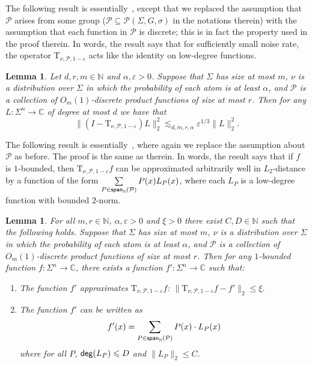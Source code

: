 \documentclass[11pt]{article}
\newtheorem{lemma}[thm]{Lemma}
\newcommand\norm[1]{\| #1 \|}
\renewcommand{\lll}{\lesssim}
\newcommand\spn{{\sf span}_{\mathbb{N}}}
\newcommand\eps{\varepsilon}
\renewcommand\leq{\leqslant}
\begin{document}
The following result is essentially~\cite[Claim 4.5]{BKM5}, except that we replaced the assumption that $\mathcal{P}$ arises from some group ($\mathcal{P}\subseteq\mathcal{P}(\Sigma,G,\sigma)$ in the notations therein) with the assumption that each function in $\mathcal{P}$ is discrete; this is in fact the property used in the proof therein. In words, the result says that for sufficiently small noise rate, the operator $\mathrm{T}_{\nu,\mathcal{P},1-\eps}$ acts like the identity on low-degree functions.
\begin{lemma}\label{lem:act_on_ld}
		Let $d,r,m\in\mathbb{N}$ and $\alpha,\eps>0$.
		Suppose that $\Sigma$ has size at most $m$, $\nu$ is a distribution over $\Sigma$
		in which the probability of each atom is at least $\alpha$, and
		$\mathcal{P}$
		is a collection of $O_m(1)$-discrete product functions of size at most $r$. Then for any $L\colon \Sigma^n\to\mathbb{C}$ of degree at most $d$
		we have that
		\[
		\norm{(I-\mathrm{T}_{\nu,\mathcal{P}, 1-\eps})L}_2^2\lll_{d,m,r,\alpha} \eps^{1/3}\norm{L}_2^2.
		\]
	\end{lemma}
The following result is essentially~\cite[Lemma 4.9]{BKM5}, where again we replace the assumption about $\mathcal{P}$ as before. The proof is the same as therein. In words, the result says that if $f$ is $1$-bounded, then $\mathrm{T}_{\nu,\mathcal{P}, 1-\eps}f$ can be approximated arbitrarily well in $L_2$-distance by a function of the form 
$\sum\limits_{P\in \spn(\mathcal{P})} P(x)L_P(x)$, where each $L_P$ is a low-degree function with bounded $2$-norm.
\begin{lemma}\label{lem:approx_formula}
		For all $m,r\in\mathbb{N}$, $\alpha, \eps>0$ and $\xi>0$ there exist $C, D\in\mathbb{N}$ such that the following holds.
		Suppose that $\Sigma$ has size at most $m$, $\nu$ is a distribution over $\Sigma$
		in which the probability of each atom is at least $\alpha$, and
		$\mathcal{P}$ is a collection of $O_m(1)$-discrete product functions of size at most $r$.
		Then for any $1$-bounded function $f\colon \Sigma^n\to\mathbb{C}$, there exists a function
		$f'\colon\Sigma^n\to\mathbb{C}$ such that:
		\begin{enumerate}
			\item The function $f'$ approximates $\mathrm{T}_{\nu,\mathcal{P}, 1-\eps}f$: $\norm{\mathrm{T}_{\nu,\mathcal{P}, 1-\eps}f - f'}_2\leq \xi$.
			\item The function $f'$ can be written as
			\[
			f'(x) = \sum\limits_{P\in \spn(\mathcal{P})}P(x)\cdot L_{P}(x)
			\]
			where for all $P$, ${\sf deg}(L_P)\leq D$ and $\norm{L_P}_2\leq C$.
		\end{enumerate}
	\end{lemma}
\end{document}
